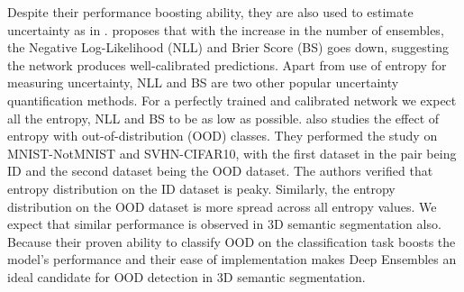 Despite their performance boosting ability, they are also used to estimate uncertainty as in \cite{lakshminarayanan2016simple}.
\cite{lakshminarayanan2016simple} proposes that with the increase in the number of ensembles, the Negative Log-Likelihood (NLL) and Brier Score (BS) goes down, suggesting the network produces well-calibrated predictions.
Apart from use of entropy for measuring uncertainty, NLL and BS are two other popular uncertainty quantification methods.
For a perfectly trained and calibrated network we expect all the entropy, NLL and BS to be as low as possible.
\cite{lakshminarayanan2016simple} also studies the effect of entropy with out-of-distribution (OOD) classes.
They performed the study on MNIST-NotMNIST and SVHN-CIFAR10, with the first dataset in the pair being ID and the second dataset being the OOD dataset.
The authors verified that entropy distribution on the ID dataset is peaky. Similarly, the entropy distribution on the OOD dataset is more spread across all entropy values.
We expect that similar performance is observed in 3D semantic segmentation also.
Because their proven ability to classify OOD on the classification task boosts the model's performance and their ease of implementation makes Deep Ensembles an ideal candidate for OOD detection in 3D semantic segmentation.

